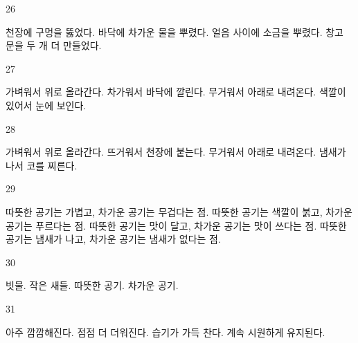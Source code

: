 \documentclass[fs9,seriesFre]{korfarm-base}
\begin{document}
\begin{kfSentenceUnit}{26}{}
\begin{kfChoices}
\kfChoice 천장에 구멍을 뚫었다.
\kfChoice 바닥에 차가운 물을 뿌렸다.
\kfChoice 얼음 사이에 소금을 뿌렸다.
\kfChoice 창고 문을 두 개 더 만들었다.
\end{kfChoices}
\end{kfSentenceUnit}

\begin{kfSentenceUnit}{27}{}
\begin{kfChoices}
\kfChoice 가벼워서 위로 올라간다.
\kfChoice 차가워서 바닥에 깔린다.
\kfChoice 무거워서 아래로 내려온다.
\kfChoice 색깔이 있어서 눈에 보인다.
\end{kfChoices}
\end{kfSentenceUnit}

\begin{kfSentenceUnit}{28}{}
\begin{kfChoices}
\kfChoice 가벼워서 위로 올라간다.
\kfChoice 뜨거워서 천장에 붙는다.
\kfChoice 무거워서 아래로 내려온다.
\kfChoice 냄새가 나서 코를 찌른다.
\end{kfChoices}
\end{kfSentenceUnit}

\begin{kfSentenceUnit}{29}{}
\begin{kfChoices}
\kfChoice 따뜻한 공기는 가볍고, 차가운 공기는 무겁다는 점.
\kfChoice 따뜻한 공기는 색깔이 붉고, 차가운 공기는 푸르다는 점.
\kfChoice 따뜻한 공기는 맛이 달고, 차가운 공기는 맛이 쓰다는 점.
\kfChoice 따뜻한 공기는 냄새가 나고, 차가운 공기는 냄새가 없다는 점.
\end{kfChoices}
\end{kfSentenceUnit}

\begin{kfSentenceUnit}{30}{}
\begin{kfChoices}
\kfChoice 빗물.
\kfChoice 작은 새들.
\kfChoice 따뜻한 공기.
\kfChoice 차가운 공기.
\end{kfChoices}
\end{kfSentenceUnit}

\begin{kfSentenceUnit}{31}{}
\begin{kfChoices}
\kfChoice 아주 깜깜해진다.
\kfChoice 점점 더 더워진다.
\kfChoice 습기가 가득 찬다.
\kfChoice 계속 시원하게 유지된다.
\end{kfChoices}
\end{kfSentenceUnit}
\end{document}
